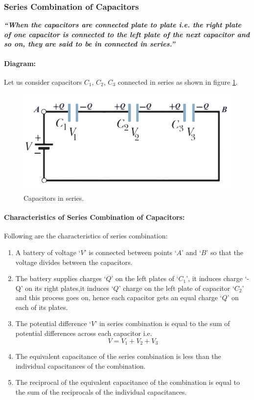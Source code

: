 \subsubsection{Series Combination of Capacitors}
\textit{
\textbf{
  “When the capacitors are connected plate to plate i.e.
  the right plate of one capacitor is connected to the left plate
  of the next capacitor and so on, they are said to be in connected in
  series.”
}
}
\paragraph{Diagram:}
Let us consider capacitors $C_{1}$, $C_{2}$,
$C_{3}$ connected in series as shown in figure \ref{fig:11.31}.
\begin{figure}[H]
  \centering
  \includegraphics[scale = 0.45]{Images/Chapter-11/11.31}
  \caption{Capacitors in series.}
  \label{fig:11.31}
\end{figure}
\paragraph{Characteristics of Series Combination of Capacitors:}
Following are  the  characteristics  
of series combination:
\begin{enumerate}[label = (\roman*)]
\item A battery of voltage `$V$' is connected between points `$A$' and `$B$' so
that the voltage divides between the capacitors.
\item The battery supplies charges `$Q$' on the left plates of `$C_{1}$’,
it induces charge `-Q’ on its right plates,it induces `$Q$' charge on the
left plate of capacitor `$C_{2}$’ and this process goes on,
hence each capacitor gets an equal charge `$Q$' on each of its plates.
\item The potential difference `$V$' in series combination is equal to the
sum of potential differences across each capacitor i.e.
\begin{equation}\nonumber
  V = V_{1} + V_{2} + V_{3}
\end{equation}
\item The equivalent capacitance of the series combination is less than
the individual capacitances of the combination.
\item The reciprocal of the equivalent capacitance of the combination is
equal to the sum of the reciprocals of the individual capacitances.
\end{enumerate}
